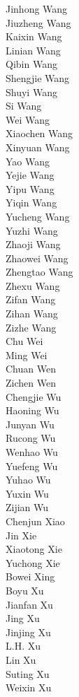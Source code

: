 Jinhong Wang\\
Jiuzheng Wang\\
Kaixin Wang\\
Linian Wang\\
Qibin Wang\\
Shengjie Wang\\
Shuyi Wang\\
Si Wang\\
Wei Wang\\
Xiaochen Wang\\
Xinyuan Wang\\
Yao Wang\\
Yejie Wang\\
Yipu Wang\\
Yiqin Wang\\
Yucheng Wang\\
Yuzhi Wang\\
Zhaoji Wang\\
Zhaowei Wang\\
Zhengtao Wang\\
Zhexu Wang\\
Zifan Wang\\
Zihan Wang\\
Zizhe Wang\\
Chu Wei\\
Ming Wei\\
Chuan Wen\\
Zichen Wen\\
Chengjie Wu\\
Haoning Wu\\
Junyan Wu\\
Rucong Wu\\
Wenhao Wu\\
Yuefeng Wu\\
Yuhao Wu\\
Yuxin Wu\\
Zijian Wu\\
Chenjun Xiao\\
Jin Xie\\
Xiaotong Xie\\
Yuchong Xie\\
Bowei Xing\\
Boyu Xu\\
Jianfan Xu\\
Jing Xu\\
Jinjing Xu\\
L.H. Xu\\
Lin Xu\\
Suting Xu\\
Weixin Xu\\
